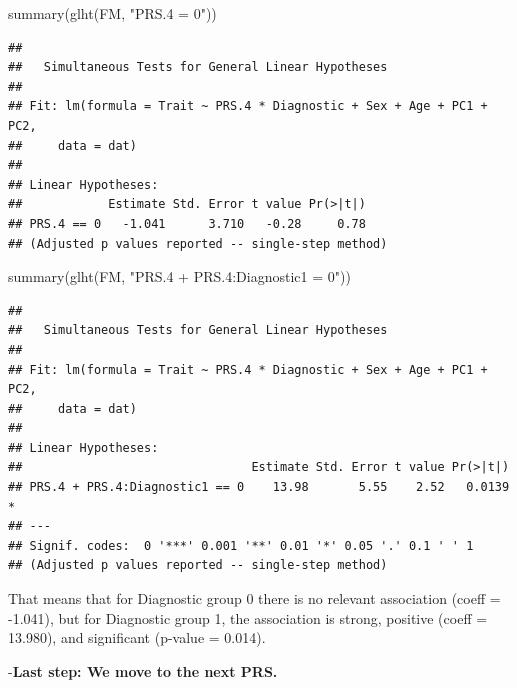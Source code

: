 \documentclass[
]{article}
\newenvironment{Shaded}{\begin{snugshade}}{\end{snugshade}}
\newcommand{\FunctionTok}[1]{\textcolor[rgb]{0.00,0.00,0.00}{#1}}
\newcommand{\NormalTok}[1]{#1}
\newcommand{\StringTok}[1]{\textcolor[rgb]{0.31,0.60,0.02}{#1}}
\begin{document}
\begin{Shaded}
\begin{Highlighting}[]
\FunctionTok{summary}\NormalTok{(}\FunctionTok{glht}\NormalTok{(FM, }\StringTok{"PRS.4 = 0"}\NormalTok{))}
\end{Highlighting}
\end{Shaded}

\begin{verbatim}
## 
##   Simultaneous Tests for General Linear Hypotheses
## 
## Fit: lm(formula = Trait ~ PRS.4 * Diagnostic + Sex + Age + PC1 + PC2, 
##     data = dat)
## 
## Linear Hypotheses:
##            Estimate Std. Error t value Pr(>|t|)
## PRS.4 == 0   -1.041      3.710   -0.28     0.78
## (Adjusted p values reported -- single-step method)
\end{verbatim}

\begin{Shaded}
\begin{Highlighting}[]
\FunctionTok{summary}\NormalTok{(}\FunctionTok{glht}\NormalTok{(FM, }\StringTok{"PRS.4  + PRS.4:Diagnostic1 = 0"}\NormalTok{))}
\end{Highlighting}
\end{Shaded}

\begin{verbatim}
## 
##   Simultaneous Tests for General Linear Hypotheses
## 
## Fit: lm(formula = Trait ~ PRS.4 * Diagnostic + Sex + Age + PC1 + PC2, 
##     data = dat)
## 
## Linear Hypotheses:
##                                Estimate Std. Error t value Pr(>|t|)  
## PRS.4 + PRS.4:Diagnostic1 == 0    13.98       5.55    2.52   0.0139 *
## ---
## Signif. codes:  0 '***' 0.001 '**' 0.01 '*' 0.05 '.' 0.1 ' ' 1
## (Adjusted p values reported -- single-step method)
\end{verbatim}

That means that for Diagnostic group 0 there is no relevant association
(coeff = -1.041), but for Diagnostic group 1, the association is strong,
positive (coeff = 13.980), and significant (p-value = 0.014).

-\textbf{Last step: We move to the next PRS.}
\end{document}
